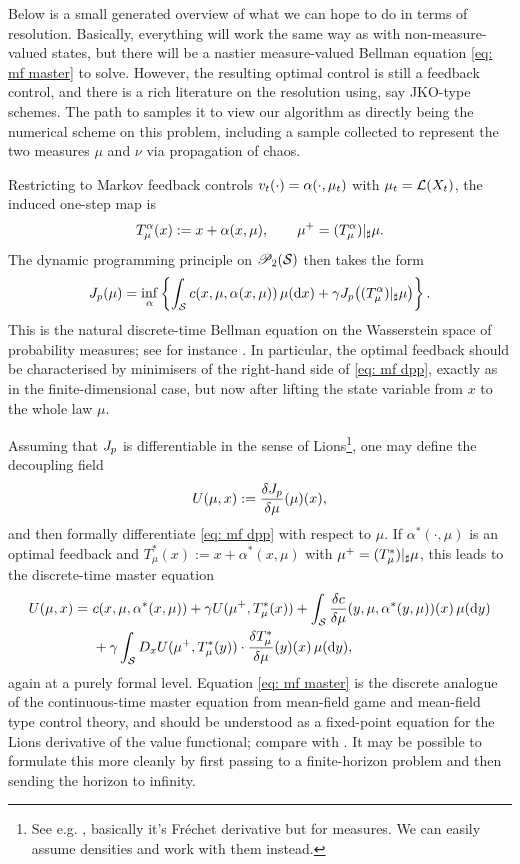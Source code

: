 \documentclass[twoside,10pt]{../jmlr}
\begin{document}
Below is a small generated overview of what we can hope to do in terms of resolution. Basically, everything will work the same way as with non-measure-valued states, but there will be a nastier measure-valued Bellman equation \eqref{eq: mf master} to solve. However, the resulting optimal control is still a feedback control, and there is a rich literature on the resolution using, say JKO-type schemes. The path to samples it to view our algorithm as directly being the numerical scheme on this problem, including a sample collected to represent the two measures $\mu$ and $\nu$ via propagation of chaos. 


Restricting to Markov feedback controls $v_t(\cdot)=\alpha(\cdot,\mu_t)$ with $\mu_t=\mathcal{L}(X_t)$, the induced one-step map is
\[
    T^\alpha_\mu(x):=x+\alpha(x,\mu),\qquad \mu^+=(T^\alpha_\mu)\vert_\sharp\mu.
\]
The dynamic programming principle on $\mathscr{P}_2(\mathcal{S})$ then takes the form
\begin{align}
    J_p(\mu)=\inf_{\alpha}\left\{\int_{\mathcal{S}} c(x,\mu,\alpha(x,\mu))\,\mu(\mathrm{d} x)+\gamma J_p\big((T^\alpha_\mu)\vert_\sharp\mu\big)\right\}.\label{eq: mf dpp}
\end{align}
This is the natural discrete-time Bellman equation on the Wasserstein space of probability measures; see for instance \citet{PW18,BFY13,CD18I}. In particular, the optimal feedback should be characterised by minimisers of the right-hand side of \eqref{eq: mf dpp}, exactly as in the finite-dimensional case, but now after lifting the state variable from $x$ to the whole law $\mu$.

Assuming that $J_p$ is differentiable in the sense of Lions\footnote{See e.g. \citet{bao2021bismut}, basically it's Fréchet derivative but for measures. We can easily assume densities and work with them instead.}, one may define the decoupling field
\[
    U(\mu,x):=\frac{\delta J_p}{\delta\mu}(\mu)(x),
\]
and then formally differentiate \eqref{eq: mf dpp} with respect to $\mu$. If $\alpha^*(\cdot,\mu)$ is an optimal feedback and $T^*_{\mu}(x):=x+\alpha^*(x,\mu)$ with $\mu^+=(T^*_{\mu})\vert_\sharp\mu$, this leads to the discrete-time master equation
\begin{align}
    U(\mu,x)=&\ c(x,\mu,\alpha^*(x,\mu))+\gamma U(\mu^+,T^*_{\mu}(x))+\int_{\mathcal{S}}\frac{\delta c}{\delta\mu}(y,\mu,\alpha^*(y,\mu))(x)\,\mu(\mathrm{d} y)\label{eq: mf master}\\
    &\ +\gamma\int_{\mathcal{S}} D_xU(\mu^+,T^*_{\mu}(y))\cdot \frac{\delta T^*_{\mu}}{\delta\mu}(y)(x)\,\mu(\mathrm{d} y),\notag
\end{align}
again at a purely formal level. Equation \eqref{eq: mf master} is the discrete analogue of the continuous-time master equation from mean-field game and mean-field type control theory, and should be understood as a fixed-point equation for the Lions derivative of the value functional; compare with \citet{CDLL19,CD18II}. It may be possible to formulate this more cleanly by first passing to a finite-horizon problem and then sending the horizon to infinity.
\end{document}
